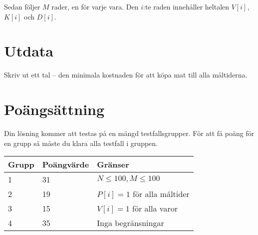 Sedan följer $M$ rader, en för varje vara.
Den $i$:te raden innehåller heltalen $V[i]$, $K[i]$ och $D[i]$.

\section*{Utdata}
Skriv ut ett tal -- den minimala kostnaden för att köpa mat till alla måltiderna.

\section*{Poängsättning}
Din lösning kommer att testas på en mängd testfallsgrupper. För att få poäng för en grupp
så måste du klara alla testfall i gruppen.

\noindent
\begin{tabular}{| l | l | l |}
\hline
  Grupp & Poängvärde & Gränser \\ \hline
  1     & 31         & $N \le 100, M \le 100$ \\ \hline
  2     & 19         & $P[i] = 1$ för alla måltider \\ \hline
  3     & 15         & $V[i] = 1$ för alla varor \\ \hline
  4     & 35         & Inga begränsningar \\ \hline
\end{tabular}
